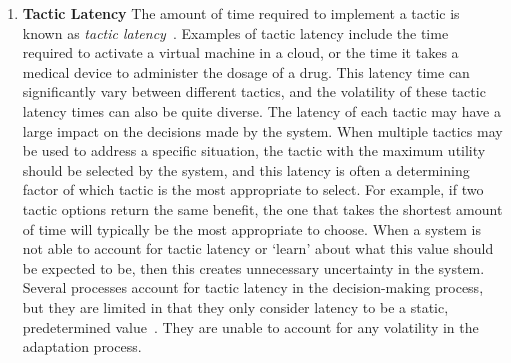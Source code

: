 \documentclass[11pt]{proposalnsf}
\newlength\q %
\begin{document}
\begin{sloppypar}
\begin{enumerate}[noitemsep]
	\item \textbf{Tactic Latency} The amount of time required to implement a tactic is known as \emph{tactic latency}~\cite{Moreno:2018:FED:3208359.3149180,moreno2017adaptation}. Examples of tactic latency include the time required to activate a virtual machine in a cloud, or the time it takes a medical device to administer the dosage of a drug. This latency time can significantly vary between different tactics, and the volatility of these tactic latency times can also be quite diverse. The latency of each tactic may have a large impact on the decisions made by the system. When multiple tactics may be used to address a specific situation, the tactic with the maximum utility should be selected by the system, and this latency is often a determining factor of which tactic is the most appropriate to select. For example, if two tactic options return the same benefit, the one that takes the shortest amount of time will typically be the most appropriate to choose. When a system is not able to account for tactic latency or `learn' about what this value should be expected to be, then this creates unnecessary uncertainty in the system. Several processes account for tactic latency in the decision-making process, but they are limited in that they only consider latency to be a static, predetermined value~\cite{camara2014stochastic, moreno2017adaptation}. They are unable to account for any volatility in the adaptation process.
    
    


\end{enumerate}
\end{sloppypar}
\end{document}
